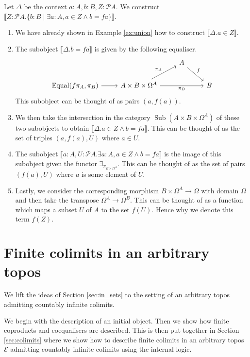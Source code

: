 \documentclass{tac}
\newcommand{\call}[1]{\mathcal{#1}}
\newcommand{\lto}{\longrightarrow}
\begin{document}
	\begin{example}
		Let $\Delta$ be the context $a:A, b:B, Z:\call{P}A$. We construct $ \llbracket Z:\call{P}A . \lbrace b:B \mid \exists a:A, a \in Z \wedge b = fa \rbrace\rrbracket$.
		\begin{enumerate}
			\item We have already shown in Example \ref{ex:union} how to construct $\llbracket \Delta. a \in Z\rrbracket$.
			\item The subobject $\llbracket \Delta. b = fa\rrbracket$ is given by the following equaliser.
			\begin{equation}
				\begin{tikzcd}
					& & A\arrow[dr,"{f}"]\\
					\operatorname{Equal}(f\pi_A, \pi_B)\arrow[r] & A \times B \times \Omega^A\arrow[ur,"{\pi_A}"]\arrow[rr,swap,"{\pi_B}"] & & B
				\end{tikzcd}
			\end{equation}
			This subobject can be thought of as pairs $(a,f(a))$.
			\item We then take the intersection in the category $\operatorname{Sub}(A \times B \times \Omega^A)$ of these two subobjects to obtain $\llbracket \Delta. a \in Z \wedge b = fa\rrbracket$. This can be thought of as the set of triples $(a,f(a),U)$ where $a \in U$.
			\item The subobject $\llbracket a:A, U: \call{P}A. \exists a:A, a \in Z \wedge b = fa\rrbracket$ is the image of this subobject given the functor $\exists_{\pi_{B \times \Omega^A}}$. This can be thought of as the set of pairs $(f(a),U)$ where $a$ is some element of $U$.
			\item Lastly, we consider the corresponding morphism $B \times \Omega^A \lto \Omega$ with domain $\Omega$ and then take the transpose $\Omega^A \lto \Omega^B$. This can be thought of as a function which maps a subset $U$ of $A$ to the set $f(U)$. Hence why we denote this term $f(Z)$.
		\end{enumerate}
	\end{example}
	
	\section{Finite colimits in an arbitrary topos}\label{sec:arbitrary_topos}
	We lift the ideas of Section \ref{sec:in_sets} to the setting of an arbitrary topos admitting countably infinite colimits.
	
	We begin with the description of an initial object. Then we show how finite coproducts and coequalisers are described. This is then put together in Section \ref{sec:colimits} where we show how to describe finite colimits in an arbitrary topos $\call{E}$ admitting countably infinite colimits using the internal logic.
	
\end{document}
